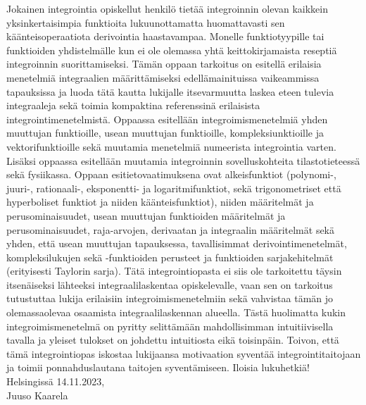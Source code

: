\documentclass[../integrointiopas.tex]{subfiles}
\begin{document}
	Jokainen integrointia opiskellut henkilö tietää integroinnin olevan kaikkein yksinkertaisimpia funktioita lukuunottamatta huomattavasti sen käänteisoperaatiota derivointia haastavampaa. Monelle funktiotyypille tai funktioiden yhdistelmälle kun ei ole olemassa yhtä keittokirjamaista reseptiä integroinnin suorittamiseksi. Tämän oppaan tarkoitus on esitellä erilaisia menetelmiä integraalien määrittämiseksi edellämainituissa vaikeammissa tapauksissa ja luoda tätä kautta lukijalle itsevarmuutta laskea eteen tulevia integraaleja sekä toimia kompaktina referenssinä erilaisista integrointimenetelmistä. Oppaassa esitellään integroimismenetelmiä yhden muuttujan funktioille, usean muuttujan funktioille, kompleksiunktioille ja vektorifunktioille sekä muutamia menetelmiä numeerista integrointia varten. Lisäksi oppaassa esitellään muutamia integroinnin sovelluskohteita tilastotieteessä sekä fysiikassa. Oppaan esitietovaatimuksena ovat alkeisfunktiot (polynomi-, juuri-, rationaali-, eksponentti- ja logaritmifunktiot, sekä trigonometriset että hyperboliset funktiot ja niiden käänteisfunktiot), niiden määritelmät ja perusominaisuudet, usean muuttujan funktioiden määritelmät ja perusominaisuudet, raja-arvojen, derivaatan ja integraalin määritelmät sekä yhden, että usean muuttujan tapauksessa, tavallisimmat derivointimenetelmät, kompleksilukujen sekä -funktioiden perusteet ja funktioiden sarjakehitelmät (erityisesti Taylorin sarja). Tätä integrointiopasta ei siis ole tarkoitettu täysin itsenäiseksi lähteeksi integraalilaskentaa opiskelevalle, vaan sen on tarkoitus tutustuttaa lukija erilaisiin integroimismenetelmiin sekä vahvistaa tämän jo olemassaolevaa osaamista integraalilaskennan alueella. Tästä huolimatta kukin integroimismenetelmä on pyritty selittämään mahdollisimman intuitiivisella tavalla ja yleiset tulokset on johdettu intuitiosta eikä toisinpäin. Toivon, että tämä integrointiopas iskostaa lukijaansa motivaation syventää integrointitaitojaan ja toimii ponnahduslautana taitojen syventämiseen. Iloisia lukuhetkiä! \\
	
	\noindent Helsingissä 14.11.2023, \\
	
	\noindent Juuso Kaarela
\end{document}

